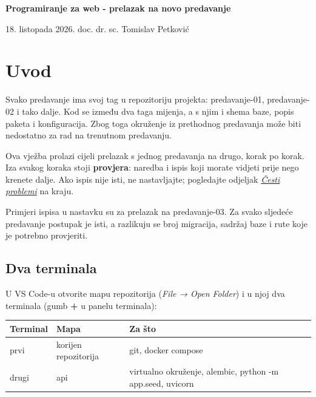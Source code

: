 \documentclass[11pt,a4paper]{article}
\newcommand{\code}[1]{{\ttfamily\small #1}}
\newcommand{\zaglavlje}{\rowcolor{tint}}
\begin{document}
{\raggedright{}\color{ink}\fontsize{22}{26}\selectfont\bfseries Programiranje za web - prelazak na novo predavanje\par}
\vspace{0.3em}
{\color{muted}18. listopada 2026. \textperiodcentered{} doc. dr. sc. Tomislav Petković\par}
\vspace{0.4em}

\section{Uvod}

Svako predavanje ima svoj tag u repozitoriju projekta: \code{predavanje-01},
\code{predavanje-02} i tako dalje. Kod se između dva taga mijenja, a s njim i shema baze,
popis paketa i konfiguracija. Zbog toga okruženje iz prethodnog predavanja može biti
nedostatno za rad na trenutnom predavanju.

Ova vježba prolazi cijeli prelazak s jednog predavanja na drugo, korak po korak. Iza
svakog koraka stoji \textbf{provjera}: naredba i ispis koji morate vidjeti prije nego
krenete dalje. Ako ispis nije isti, ne nastavljajte; pogledajte odjeljak
\hyperref[sec:problemi]{\emph{Česti problemi}} na kraju.

Primjeri ispisa u nastavku su za prelazak na \code{predavanje-03}. Za svako sljedeće
predavanje postupak je isti, a razlikuju se broj migracija, sadržaj baze i rute koje je
potrebno provjeriti.

\subsection{Dva terminala}

U VS Code-u otvorite mapu repozitorija (\emph{File → Open Folder}) i u njoj dva terminala
(gumb \textbf{+} u panelu terminala):

\begin{center}\small
\begin{tabularx}{\linewidth}{P{2.2cm}P{3.6cm}L}
\toprule
\zaglavlje \textbf{Terminal} & \textbf{Mapa} & \textbf{Za što}\\
\midrule
prvi & korijen repozitorija & \code{git}, \code{docker compose}\\
drugi & \code{api} & virtualno okruženje, \code{alembic}, \code{python -m app.seed}, \code{uvicorn}\\
\bottomrule
\end{tabularx}
\end{center}
\end{document}
